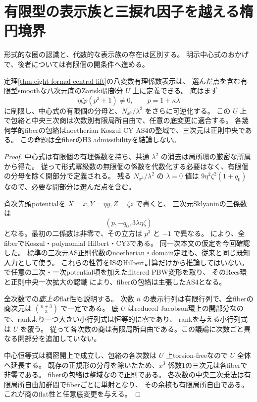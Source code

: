 \section{有限型の表示族と三捩れ因子を越える楕円境界}
\label{sec:algebraic-boundary}
形式的な圏の認識と、代数的な表示族の存在は区別する。
明示中心式のおかげで、後者については有限個の開条件へ進める。

\begin{proposition}[有限型底上の全次数平坦な表示]\label{prop:algebraic-presentation-flat}
定理\ref{thm:eight-formal-central-lift}の八変数有理係数表示は、
選んだ点を含む有限型smoothな八次元底のZariski開部分 $U$ 上に定義できる。
底はまず
\[
 \eta\zeta p(p^3+1)\ne0,\qquad p=1+\kappa\lambda
\]
に制限し、中心式の有限個の分母と、$N_{x^3}/\lambda^2$ をさらに可逆化する。
この $U$ 上で包絡と中央三次商は次数別有限局所自由で、任意の底変更に適合する。
各幾何学的fiberの包絡はnoetherian Koszul CY AS4の整域で、三次元は正則中央である。
この命題は全fiberのH3 admissibilityを結論しない。
\end{proposition}
\begin{proof}
中心式は有限個の有理係数を持ち、共通 $\lambda^2$ の消去は局所環の厳密な所属から得た。
従って形式冪級数の無限個の係数を代数化する必要はなく、有限個の分母を除く開部分で定義される。
残る $N_{x^3}/\lambda^2$ の $\lambda=0$ 値は
$9\eta^2\zeta^2(1+q_0)$ なので、必要な開部分は選んだ点を含む。

斉次先頭potentialを $X=x,Y=\eta y,Z=\zeta z$ で書くと、
三次元Sklyaninの三係数は
\[
 (p,-q_0,3\lambda\eta\zeta)
\]
となる。最初の二係数は非零で、その立方は $p^3$ と $-1$ で異なる。
\cite[Theorem1.1, Corollary6.1]{IS}により、全fiberでKoszul・polynomial Hilbert・CY3である。
同一次本文の仮定を今回確認した。
標準の三次元AS正則代数のnoetherian・domain定理も、従来と同じ既知入力として使う。
これらの性質をISのHilbert計算だけから推論してはいない。
\cite[Theorem3.3.2(i)]{EG}で任意の二次・一次potential項を加えたfiltered PBW変形を取り、
そのRees環と正則中央一次拡大の認識 \cite{LBS} により、fiberの包絡は主張したAS4となる。

全次数での\emph{底上の}flat性も説明する。
次数 $n$ の表示行列は有限行列で、全fiberの商次元は $\binom{n+3}{3}$ で一定である。
底 $U$ はreduced Jacobson環上の開部分なので、rankより一つ大きい小行列式は恒等的に零であり、
rankを与える小行列式は $U$ を覆う。
従って各次数の商は有限局所自由である。この議論に次数ごと異なる開部分を追加していない。

中心恒等式は稠密開上で成立し、包絡の各次数は $U$ 上torsion-freeなので $U$ 全体へ延長する。
既存の正規形の分母を除いたため、$x^3$ 係数1の三次元は各fiberで非零である。
fiberの包絡は整域なので正則である。
各次数の中央三次乗法は有限局所自由加群間でfiberごとに単射となり、
その余核も有限局所自由である。これが商のflat性と任意底変更を与える。
\end{proof}

